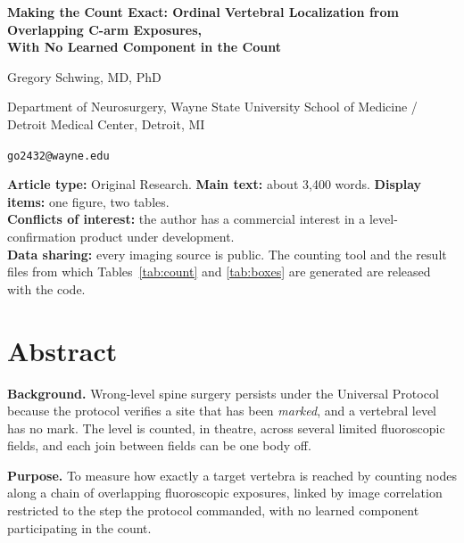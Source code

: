 \documentclass[11pt,letterpaper]{article}
\begin{document}
\begin{center}
{\Large\bfseries Making the Count Exact: Ordinal Vertebral Localization from Overlapping C-arm Exposures,\\ With No Learned Component in the Count\par}
\vspace{0.8em}
{\normalsize Gregory Schwing, MD, PhD\par}
\vspace{0.3em}
{\small Department of Neurosurgery, Wayne State University School of Medicine / Detroit Medical Center, Detroit, MI\par}
{\small \texttt{go2432@wayne.edu}\par}
\end{center}

\vspace{0.5em}
\noindent\textbf{Article type:} Original Research. \textbf{Main text:} about 3,400 words.
\textbf{Display items:} one figure, two tables.\\
\textbf{Conflicts of interest:} the author has a commercial interest in a level-confirmation product under
development.\\
\textbf{Data sharing:} every imaging source is public. The counting tool and the result files from which
Tables~\ref{tab:count} and \ref{tab:boxes} are generated are released with the code.

\section*{Abstract}

\noindent\textbf{Background.} Wrong-level spine surgery persists under the Universal Protocol because the
protocol verifies a site that has been \emph{marked}, and a vertebral level has no mark. The level is
counted, in theatre, across several limited fluoroscopic fields, and each join between fields can be one
body off.

\noindent\textbf{Purpose.} To measure how exactly a target vertebra is reached by counting nodes along a
chain of overlapping fluoroscopic exposures, linked by image correlation restricted to the step the
protocol commanded, with no learned component participating in the count.
\end{document}
